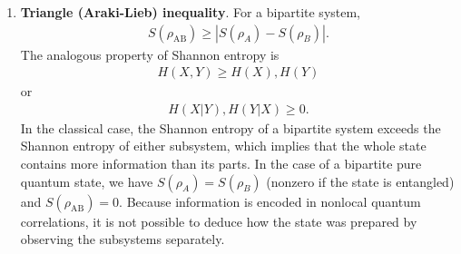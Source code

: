 \documentclass[a4paper, 12pt]{article}
\numberwithin{equation}{section}
\numberwithin{figure}{section}
\theoremstyle{definition}
\begin{document}
\begin{enumerate}[label=\textbf{(\arabic*)}]
        \item
            \textbf{Triangle (Araki-Lieb) inequality}. For a bipartite system,
            \begin{align}
                S(\rho_\text{AB}) \geq |S(\rho_A) - S(\rho_B)|.
            \end{align}
            The analogous property of Shannon entropy is
            \begin{align}
                H(X, Y) \geq H(X), H(Y)
            \end{align}
            or
            \begin{align}
                H(X | Y), H(Y | X) \geq 0.
            \end{align}
            In the classical case, the Shannon entropy of a bipartite system exceeds the Shannon entropy of either subsystem, which implies that the whole state contains more information than its parts. In the case of a bipartite pure quantum state, we have $S(\rho_A) = S(\rho_B)$ (nonzero if the state is entangled) and $S(\rho_\text{AB}) = 0$. Because information is encoded in nonlocal quantum correlations, it is not possible to deduce how the state was prepared by observing the subsystems separately.
    \end{enumerate}
\end{document}
